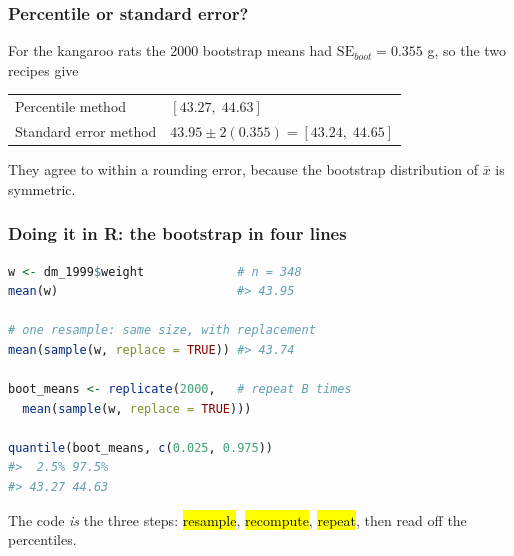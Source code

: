 \documentclass[slidestop,compress,mathserif]{beamer}
\begin{document}
\begin{frame}
\frametitle{Percentile or standard error?}

For the kangaroo rats the 2000 bootstrap means had $\mathrm{SE}_{boot}=0.355$ g, so the two recipes give

\vspace{-0.2em}
\begin{center}
\begin{tabular}{ll}
\toprule
Percentile method & $[43.27,\;44.63]$ \\
Standard error method & $43.95 \pm 2(0.355) = [43.24,\;44.65]$ \\
\bottomrule
\end{tabular}
\end{center}

\vspace{0.1em}
They agree to within a rounding error, because the bootstrap distribution of $\bar{x}$ is symmetric.

\vspace{0.1em}

\end{frame}

\begin{frame}[fragile]
\frametitle{Doing it in R: the bootstrap in four lines}

\begin{lstlisting}[language=R, basicstyle=\ttfamily\scriptsize]
w <- dm_1999$weight             # n = 348
mean(w)                         #> 43.95

# one resample: same size, with replacement
mean(sample(w, replace = TRUE)) #> 43.74

boot_means <- replicate(2000,   # repeat B times
  mean(sample(w, replace = TRUE)))

quantile(boot_means, c(0.025, 0.975))
#>  2.5% 97.5%
#> 43.27 44.63
\end{lstlisting}

\vspace{-0.4em}
The code \emph{is} the three steps: \hl{resample}, \hl{recompute}, \hl{repeat}, then read off the percentiles.

\end{frame}
\end{document}
